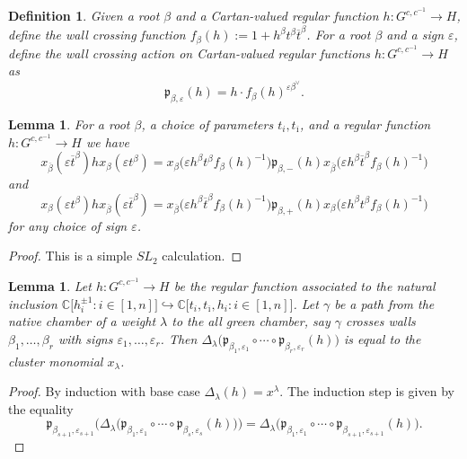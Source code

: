 \documentclass{amsart}
\newtheorem{definition}[theorem]{Definition}
\newtheorem{lemma}[theorem]{Lemma}
\numberwithin{theorem}{section}
\newcommand{\fp}{\mathfrak{p}}
\newcommand{\CC}{\mathbb{C}}
\newcommand{\into}{\hookrightarrow}
\newcommand{\obeta}{{\overline{\beta}}}
\newcommand{\oi}{{\overline{\imath}}}
\newcommand{\ot}{{\overline{t}}}
\begin{document}
    \begin{definition}
      Given a root $\beta$ and a Cartan-valued regular function $h:G^{c,c^{-1}}\to H$, define the wall crossing function $f_\beta(h):=1+h^\beta t^\beta \ot^\beta$.
      For a root $\beta$ and a sign $\varepsilon$, define the wall crossing action on Cartan-valued regular functions $h:G^{c,c^{-1}}\to H$ as 
      \[\fp_{\beta,\varepsilon}(h)=h\cdot f_\beta(h)^{\varepsilon\beta^\vee}.\]
    \end{definition}
    \begin{lemma}
      For a root $\beta$, a choice of parameters $t_i, t_\oi$, and a regular function $h:G^{c,c^{-1}}\to H$ we have
      \[x_\obeta(\varepsilon \ot^\beta) h x_\beta(\varepsilon t^\beta) = x_\beta\big(\varepsilon h^\beta t^\beta f_\beta(h)^{-1}\big) \fp_{\beta,-}(h) x_\obeta\big(\varepsilon h^\beta \ot^\beta f_\beta(h)^{-1}\big)\]
      and
      \[x_\beta(\varepsilon t^\beta) h x_\obeta(\varepsilon \ot^\beta) = x_\obeta\big(\varepsilon h^\beta \ot^\beta f_\beta(h)^{-1}\big) \fp_{\beta,+}(h) x_\beta\big(\varepsilon h^\beta t^\beta f_\beta(h)^{-1}\big)\]
      for any choice of sign $\varepsilon$.
    \end{lemma}
    \begin{proof}
      This is a simple $SL_2$ calculation.
    \end{proof}
 
    \begin{lemma}
      Let $h:G^{c,c^{-1}}\to H$ be the regular function associated to the natural inclusion $\CC\big[h_i^{\pm1}:i\in[1,n]\big]\into\CC\big[t_i,t_\oi,h_i:i\in[1,n]\big]$.
      Let $\gamma$ be a path from the native chamber of a weight $\lambda$ to the all green chamber, say $\gamma$ crosses walls $\beta_1,\ldots,\beta_r$ with signs $\varepsilon_1,\ldots,\varepsilon_r$.
      Then $\Delta_\lambda\big(\fp_{\beta_1,\varepsilon_1}\circ\cdots\circ\fp_{\beta_r,\varepsilon_r}(h)\big)$ is equal to the cluster monomial $x_\lambda$.
    \end{lemma}
    \begin{proof}
      By induction with base case $\Delta_\lambda(h)=x^\lambda$.
      The induction step is given by the equality
      \[\fp_{\beta_{s+1},\varepsilon_{s+1}}\Big(\Delta_\lambda\big(\fp_{\beta_1,\varepsilon_1}\circ\cdots\circ\fp_{\beta_s,\varepsilon_s}(h)\big)\Big)=\Delta_\lambda\big(\fp_{\beta_1,\varepsilon_1}\circ\cdots\circ\fp_{\beta_{s+1},\varepsilon_{s+1}}(h)\big).\]
    \end{proof}



  
\end{document}
